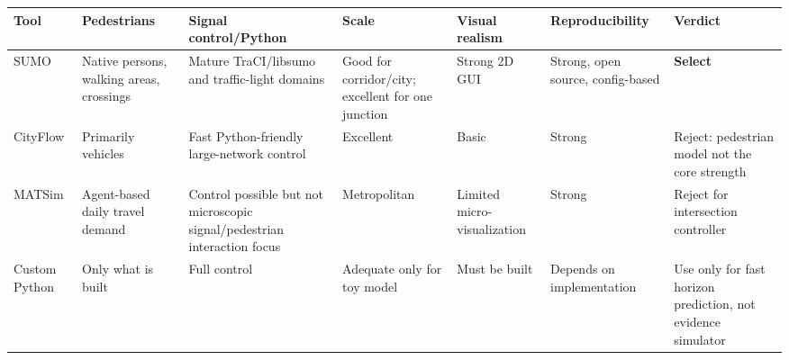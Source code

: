\documentclass[
  english,
  11pt,
  a4paper,
]{article}
\newcounter{none} %
\begin{document}
{\def\LTcaptype{none} %
\begin{longtable}[]{@{}
  >{\raggedright\arraybackslash}p{}
  >{\raggedright\arraybackslash}p{}
  >{\raggedright\arraybackslash}p{}
  >{\raggedright\arraybackslash}p{}
  >{\raggedright\arraybackslash}p{}
  >{\raggedright\arraybackslash}p{}
  >{\raggedright\arraybackslash}p{}@{}}
\toprule\noalign{}
\begin{minipage}[b]{\linewidth}\raggedright
Tool
\end{minipage} & \begin{minipage}[b]{\linewidth}\raggedright
Pedestrians
\end{minipage} & \begin{minipage}[b]{\linewidth}\raggedright
Signal control/Python
\end{minipage} & \begin{minipage}[b]{\linewidth}\raggedright
Scale
\end{minipage} & \begin{minipage}[b]{\linewidth}\raggedright
Visual realism
\end{minipage} & \begin{minipage}[b]{\linewidth}\raggedright
Reproducibility
\end{minipage} & \begin{minipage}[b]{\linewidth}\raggedright
Verdict
\end{minipage} \\
\midrule\noalign{}
\endhead
\bottomrule\noalign{}
\endlastfoot
SUMO & Native persons, walking areas, crossings & Mature TraCI/libsumo
and traffic-light domains & Good for corridor/city; excellent for one
junction & Strong 2D GUI & Strong, open source, config-based &
\textbf{Select} \\
CityFlow & Primarily vehicles & Fast Python-friendly large-network
control & Excellent & Basic & Strong & Reject: pedestrian model not the
core strength \\
MATSim & Agent-based daily travel demand & Control possible but not
microscopic signal/pedestrian interaction focus & Metropolitan & Limited
micro-visualization & Strong & Reject for intersection controller \\
Custom Python & Only what is built & Full control & Adequate only for
toy model & Must be built & Depends on implementation & Use only for
fast horizon prediction, not evidence simulator \\
\end{longtable}
}
\end{document}
